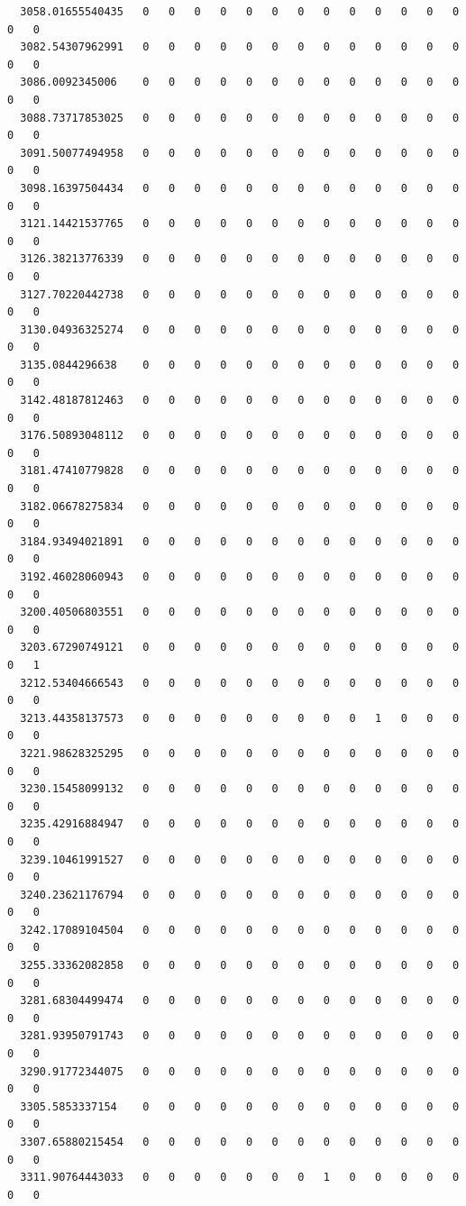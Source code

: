 \documentclass[
  letterpaper,
  DIV=11,
  numbers=noendperiod]{scrartcl}
\begin{document}
\begin{verbatim}
  3058.01655540435   0   0   0   0   0   0   0   0   0   0   0   0   0   0   0
  3082.54307962991   0   0   0   0   0   0   0   0   0   0   0   0   0   0   0
  3086.0092345006    0   0   0   0   0   0   0   0   0   0   0   0   0   0   0
  3088.73717853025   0   0   0   0   0   0   0   0   0   0   0   0   0   0   0
  3091.50077494958   0   0   0   0   0   0   0   0   0   0   0   0   0   0   0
  3098.16397504434   0   0   0   0   0   0   0   0   0   0   0   0   0   0   0
  3121.14421537765   0   0   0   0   0   0   0   0   0   0   0   0   0   0   0
  3126.38213776339   0   0   0   0   0   0   0   0   0   0   0   0   0   0   0
  3127.70220442738   0   0   0   0   0   0   0   0   0   0   0   0   0   0   0
  3130.04936325274   0   0   0   0   0   0   0   0   0   0   0   0   0   0   0
  3135.0844296638    0   0   0   0   0   0   0   0   0   0   0   0   0   0   0
  3142.48187812463   0   0   0   0   0   0   0   0   0   0   0   0   0   0   0
  3176.50893048112   0   0   0   0   0   0   0   0   0   0   0   0   0   0   0
  3181.47410779828   0   0   0   0   0   0   0   0   0   0   0   0   0   0   0
  3182.06678275834   0   0   0   0   0   0   0   0   0   0   0   0   0   0   0
  3184.93494021891   0   0   0   0   0   0   0   0   0   0   0   0   0   0   0
  3192.46028060943   0   0   0   0   0   0   0   0   0   0   0   0   0   0   0
  3200.40506803551   0   0   0   0   0   0   0   0   0   0   0   0   0   0   0
  3203.67290749121   0   0   0   0   0   0   0   0   0   0   0   0   0   0   1
  3212.53404666543   0   0   0   0   0   0   0   0   0   0   0   0   0   0   0
  3213.44358137573   0   0   0   0   0   0   0   0   0   1   0   0   0   0   0
  3221.98628325295   0   0   0   0   0   0   0   0   0   0   0   0   0   0   0
  3230.15458099132   0   0   0   0   0   0   0   0   0   0   0   0   0   0   0
  3235.42916884947   0   0   0   0   0   0   0   0   0   0   0   0   0   0   0
  3239.10461991527   0   0   0   0   0   0   0   0   0   0   0   0   0   0   0
  3240.23621176794   0   0   0   0   0   0   0   0   0   0   0   0   0   0   0
  3242.17089104504   0   0   0   0   0   0   0   0   0   0   0   0   0   0   0
  3255.33362082858   0   0   0   0   0   0   0   0   0   0   0   0   0   0   0
  3281.68304499474   0   0   0   0   0   0   0   0   0   0   0   0   0   0   0
  3281.93950791743   0   0   0   0   0   0   0   0   0   0   0   0   0   0   0
  3290.91772344075   0   0   0   0   0   0   0   0   0   0   0   0   0   0   0
  3305.5853337154    0   0   0   0   0   0   0   0   0   0   0   0   0   0   0
  3307.65880215454   0   0   0   0   0   0   0   0   0   0   0   0   0   0   0
  3311.90764443033   0   0   0   0   0   0   0   1   0   0   0   0   0   0   0
                  

\end{verbatim}
\end{document}
